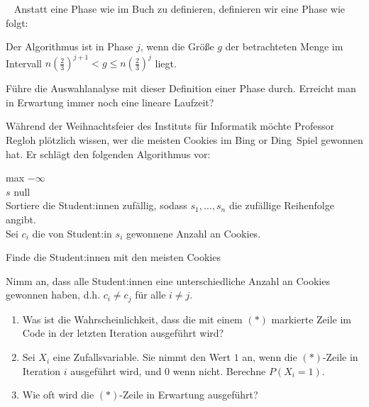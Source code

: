 \documentclass{uebung_cs}
\begin{document}
\begin{aufgabe}[Auswahlanalyse]\
	Anstatt eine Phase wie im Buch zu definieren, definieren wir eine Phase wie folgt:
	
	Der Algorithmus ist in Phase $j$, wenn die Größe $g$ der betrachteten Menge im Intervall $n\left(\frac{2}{3}\right)^{j+1} < g \leq n\left(\frac{2}{3}\right)^j$ liegt.
	
	Führe die Auswahlanalyse mit dieser Definition einer Phase durch. Erreicht man in Erwartung immer noch eine lineare Laufzeit?
\end{aufgabe}    

\begin{aufgabe}[Weihnachtsfeier im Institut]
	Während der Weihnachtsfeier des Instituts für Informatik möchte Professor Regloh plötzlich wissen, wer die meisten Cookies im \glqq Bing or Ding\grqq{}~Spiel gewonnen hat. Er schlägt den folgenden Algorithmus vor:
	
	\begin{algorithm}[H]
		\SetAlgoLined
		max \gets $- \infty$\\
		$s$ \gets null\\
		Sortiere die Student:innen zufällig, sodass $s_1,\dots,s_n$ die zufällige Reihenfolge angibt.\\
		Sei $c_i$ die von Student:in $s_i$ gewonnene Anzahl an Cookies.\\
		\caption{Finde die Student:innen mit den meisten Cookies}
\end{algorithm}
	
	Nimm an, dass alle Student:innen eine unterschiedliche Anzahl an Cookies gewonnen haben, d.h. $c_i \neq c_j$ für alle $i \neq j$.
	\begin{enumerate}
		\item Was ist die Wahrscheinlichkeit, dass die mit einem $(\ast)$ markierte Zeile im Code in der letzten Iteration ausgeführt wird?\\
		\item Sei $X_i$ eine Zufallsvariable. Sie nimmt den Wert $1$ an, wenn die $(\ast)$-Zeile in Iteration $i$ ausgeführt wird, und $0$ wenn nicht. Berechne $P(X_i = 1)$.\\%
		\item Wie oft wird die $(\ast)$-Zeile in Erwartung ausgeführt?
	\end{enumerate}
\end{aufgabe}
\end{document}
